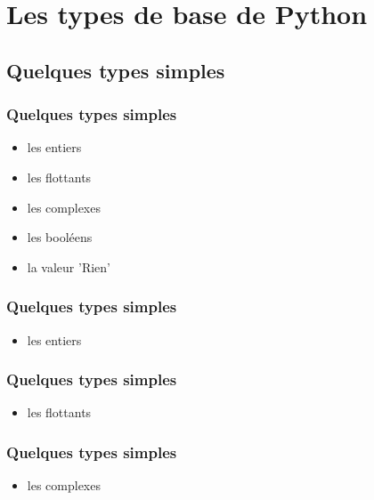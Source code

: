 \section{Les types de base de Python}
\subsection{Quelques types simples}

\begin{frame}
  \frametitle{Quelques types simples}
  \begin{itemize}
    \item<1-> les entiers
    \item<2-> les flottants
    \item<3-> les complexes
    \item<4-> les booléens
    \item<5-> la valeur 'Rien'
  \end{itemize}
\end{frame}

\begin{frame}[fragile]
  \frametitle{Quelques types simples}
  \begin{itemize}
    \item les entiers
  \end{itemize}
  \begin{ipython}
  \end{ipython}
\end{frame}

\begin{frame}[fragile]
  \frametitle{Quelques types simples}
  \begin{itemize}
    \item les flottants
  \end{itemize}
  \begin{ipython}
  \end{ipython}
\end{frame}

\begin{frame}[fragile]
  \frametitle{Quelques types simples}
  \begin{itemize}
    \item les complexes
  \end{itemize}
  \begin{ipython}
  \end{ipython}
\end{frame}

